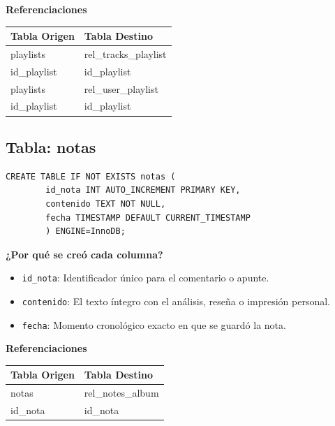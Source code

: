 \documentclass[11pt]{article}
\begin{document}
	\vspace{0.3cm}
	\noindent\textbf{Referenciaciones} \\[0.3em]
	\begin{tabular}{|l|l|}
		\hline
		\textbf{Tabla Origen} & \textbf{Tabla Destino} \\
		\hline
		playlists & rel\_tracks\_playlist \\
		id\_playlist & id\_playlist \\
		\hline
		playlists & rel\_user\_playlist \\
		id\_playlist & id\_playlist \\
		\hline
	\end{tabular}
	
	\vspace{0.5cm}
	
	\subsection{Tabla: notas}
	\begin{lstlisting}[style=sqlstyle]
		CREATE TABLE IF NOT EXISTS notas (
		id_nota INT AUTO_INCREMENT PRIMARY KEY,
		contenido TEXT NOT NULL,
		fecha TIMESTAMP DEFAULT CURRENT_TIMESTAMP
		) ENGINE=InnoDB;
	\end{lstlisting}
	
	\noindent\textbf{¿Por qué se creó cada columna?}
	\begin{itemize}[noitemsep,topsep=2pt]
		\item \texttt{id\_nota}: Identificador único para el comentario o apunte.
		\item \texttt{contenido}: El texto íntegro con el análisis, reseña o impresión personal.
		\item \texttt{fecha}: Momento cronológico exacto en que se guardó la nota.
	\end{itemize}
	
	\vspace{0.3cm}
	\noindent\textbf{Referenciaciones} \\[0.3em]
	\begin{tabular}{|l|l|}
		\hline
		\textbf{Tabla Origen} & \textbf{Tabla Destino} \\
		\hline
		notas & rel\_notes\_album \\
		id\_nota & id\_nota \\
		\hline
	\end{tabular}
	
	\vspace{0.8cm}
	
\end{document}
